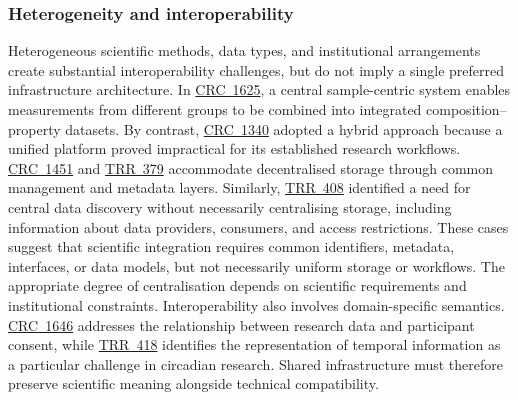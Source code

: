 \documentclass{eceasst}
\begin{document}
\subsubsection{Heterogeneity and interoperability}
Heterogeneous scientific methods, data types, and
institutional arrangements create substantial
interoperability challenges, but do not imply a
single preferred infrastructure architecture.
In \hyperref[subsec:crc1625]{CRC~1625}, a central
sample-centric system enables measurements from
different groups to be combined into integrated
composition--property datasets.
By contrast, \hyperref[subsec:crc1340]{CRC~1340}
adopted a hybrid approach because a unified
platform proved impractical for its established
research workflows.
\hyperref[subsec:crc1451]{CRC~1451} and
\hyperref[subsec:trr379]{TRR~379} accommodate
decentralised storage through common management
and metadata layers.
Similarly, \hyperref[subsec:trr408]{TRR~408}
identified a need for central data discovery
without necessarily centralising storage,
including information about data providers,
consumers, and access restrictions.
These cases suggest that scientific integration
requires common identifiers, metadata, interfaces,
or data models, but not necessarily uniform
storage or workflows. The appropriate degree of
centralisation depends on scientific requirements
and institutional constraints.
Interoperability also involves domain-specific
semantics. \hyperref[subsec:crc1646]{CRC~1646}
addresses the relationship between research data
and participant consent, while
\hyperref[subsec:trr418]{TRR~418} identifies
the representation of temporal information
as a particular challenge in circadian research.
Shared infrastructure must therefore preserve
scientific meaning alongside technical compatibility.
\end{document}

